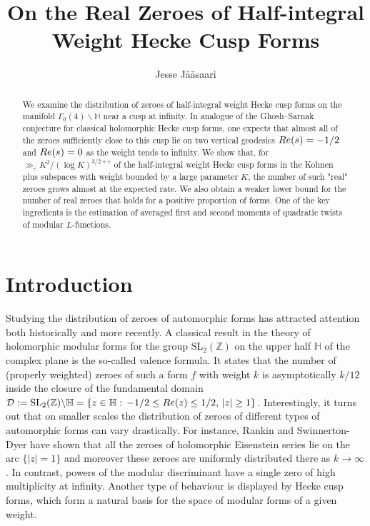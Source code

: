 \documentclass[a4paper,10pt,twoside]{amsart}
\theoremstyle{definition}
\numberwithin{equation}{section}
\renewcommand{\Re}{\textnormal{Re}}
\renewcommand\:{\colon}
\begin{document}
\title{On the Real Zeroes of Half-integral Weight Hecke Cusp Forms}

\author{Jesse J\"a\"asaari}
\address{Department of Mathematics and Statistics\\
  University of Turku\\
  20014 Turku, Finland}
  
  
\begin{abstract}   
We examine the distribution of zeroes of half-integral weight Hecke cusp forms on the manifold $\Gamma_0(4)\backslash\mathbb H$ near a cusp at infinity. In analogue of the Ghosh--Sarnak conjecture for classical holomorphic Hecke cusp forms, one expects that almost all of the zeroes sufficiently close to this cusp lie on two vertical geodesics $\Re(s)=-1/2$ and $\Re(s)=0$ as the weight tends to infinity. We show that, for $\gg_\varepsilon K^2/(\log K)^{3/2+\varepsilon}$ of the half-integral weight Hecke cusp forms in the Kohnen plus subspaces with weight bounded by a large parameter $K$, the number of such "real" zeroes grows almost at the expected rate. We also obtain a weaker lower bound for the number of real zeroes that holds for a positive proportion of forms. One of the key ingredients is the estimation of averaged first and second moments of quadratic twists of modular $L$-functions. 
\end{abstract}
  
\maketitle
         
\section{Introduction}

\noindent Studying the distribution of zeroes of automorphic forms has attracted attention both historically and more recently. A classical result in the theory of holomorphic modular forms for the group $\mathrm{SL}_2(\mathbb Z)$ on the upper half $\mathbb H$ of the complex plane is the so-called valence formula. It states that the number of (properly weighted) zeroes of such a form $f$ with weight $k$ is asymptotically $k/12$ inside the closure of the fundamental domain $\mathcal D:=\mathrm{SL}_2(\mathbb Z)\backslash\mathbb H=\{z\in\mathbb H:\, -1/2\leq \Re(z) \leq 1/2,\, |z|\geq 1\}$. Interestingly, it turns out that on smaller scales the distribution of zeroes of different types of automorphic forms can vary drastically. For instance, Rankin and Swinnerton-Dyer \cite{Rankin-Swinnerton--Dyer1970} have shown that all the zeroes of holomorphic Eisenstein series lie on the arc $\{|z|=1\}$ and moreover these zeroes are uniformly distributed there as $k\longrightarrow\infty$. In contrast, powers of the modular discriminant have a single zero of high multiplicity at infinity. Another type of behaviour is displayed by Hecke cusp forms, which form a natural basis for the space of modular forms of a given weight. 
\end{document}
